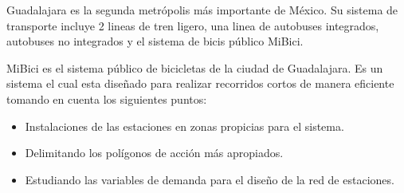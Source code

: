Guadalajara es la segunda metrópolis más importante de México. Su sistema de transporte incluye 2 lineas de tren ligero, una linea de autobuses integrados, autobuses no integrados y el sistema de bicis público MiBici.

MiBici es el sistema público de bicicletas de la ciudad de Guadalajara. Es un sistema el cual esta diseñado para realizar recorridos cortos de manera eficiente tomando en cuenta los siguientes puntos:

\begin{itemize}
  \item Instalaciones de las estaciones en zonas propicias para el sistema.
  \item Delimitando los polígonos de acción más apropiados.
  \item Estudiando las variables de demanda para el diseño de la red de estaciones.
\end{itemize}